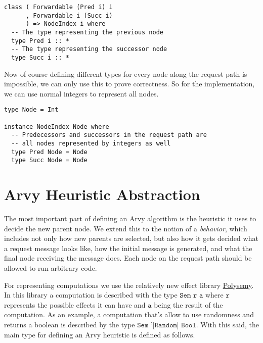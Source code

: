 \documentclass[a4paper, oneside]{discothesis}
\begin{document}
\begin{verbatim}
class ( Forwardable (Pred i) i
      , Forwardable i (Succ i)
      ) => NodeIndex i where
  -- The type representing the previous node
  type Pred i :: *
  -- The type representing the successor node
  type Succ i :: *
\end{verbatim}

Now of course defining different types for every node along the request path is impossible, we can only use this to prove correctness. So for the implementation, we can use normal integers to represent all nodes.

\begin{verbatim}
type Node = Int

instance NodeIndex Node where
  -- Predecessors and successors in the request path are
  -- all nodes represented by integers as well
  type Pred Node = Node
  type Succ Node = Node
\end{verbatim}

\section{Arvy Heuristic Abstraction}

The most important part of defining an Arvy algorithm is the heuristic it uses to decide the new parent node. We extend this to the notion of a \textit{behavior}, which includes not only how new parents are selected, but also how it gets decided what a request message looks like, how the initial message is generated, and what the final node receiving the message does. Each node on the request path should be allowed to run arbitrary code.

For representing computations we use the relatively new effect library \href{https://hackage.haskell.org/package/polysemy}{Polysemy}. In this library a computation is described with the type $\texttt{Sem r a}$ where $\texttt{r}$ represents the possible effects it can have and $\texttt{a}$ being the result of the computation. As an example, a computation that's allow to use randomness and returns a boolean is described by the type $\texttt{Sem '[Random] Bool}$. With this said, the main type for defining an Arvy heuristic is defined as follows.
\end{document}
